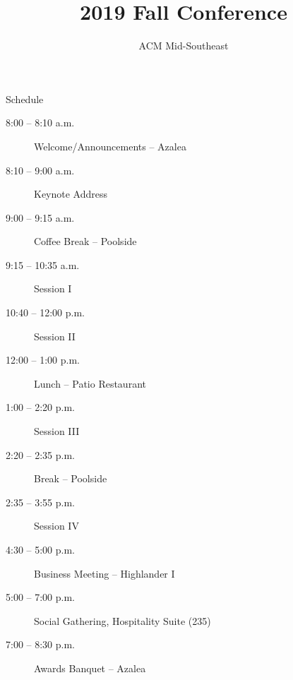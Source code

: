 \documentclass[handout]{beamer}
\title{2019 Fall Conference}
\author{ACM Mid-Southeast}
\date[]{}
\begin{document}
\begin{frame}
  \titlepage
\end{frame}






\begin{frame}{Schedule}
    \begin{description}
        \item[8:00 -- 8:10 a.m.] Welcome/Announcements -- Azalea
        \item[8:10 -- 9:00 a.m.] Keynote Address
        \item[9:00 -- 9:15 a.m.] Coffee Break -- Poolside
        \item[9:15 -- 10:35 a.m.] Session I
        \item[10:40 -- 12:00 p.m.] Session II
        \item[12:00 -- 1:00 p.m.] Lunch -- Patio Restaurant
        \item[1:00 -- 2:20 p.m.] Session III
        \item[2:20 -- 2:35 p.m.] Break -- Poolside
        \item[2:35 -- 3:55 p.m.] Session IV
        \item[4:30 -- 5:00 p.m.] Business Meeting -- Highlander I
        \item[5:00 -- 7:00 p.m.] Social Gathering, Hospitality Suite (235)
        \item[7:00 -- 8:30 p.m.] Awards Banquet -- Azalea
    \end{description}
\end{frame}
\end{document}
